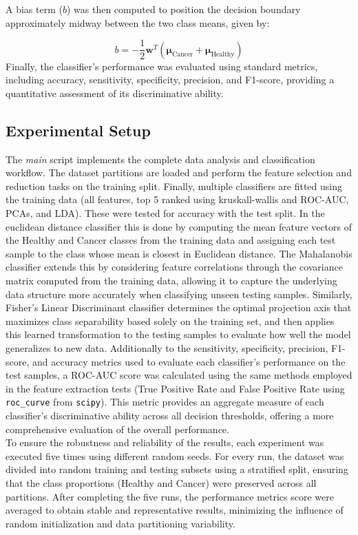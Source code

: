 \documentclass[a4paper,12pt]{article}
\begin{document}
A bias term ($b$) was then computed to position the decision boundary approximately midway between the two class means, given by:

\[
b = -\frac{1}{2}\mathbf{w}^T(\boldsymbol{\mu}_{\text{Cancer}} + \boldsymbol{\mu}_{\text{Healthy}})
\]
Finally, the classifier’s performance was evaluated using standard metrics, including 
accuracy, sensitivity, specificity, precision, and F1-score, providing a quantitative assessment of its discriminative ability.



\subsection{Experimental Setup}

The \textit{main} script implements the complete data analysis and classification workflow. The dataset partitions are loaded and perform the feature selection and reduction tasks on the training split. Finally, multiple classifiers are fitted using the training data (all features, top 5 ranked using kruskall-wallis and ROC-AUC, PCAs, and LDA). These were tested for accuracy with the test split. In the euclidean distance classifier this is done by computing the mean feature vectors of the Healthy and Cancer classes from the training data and assigning each test sample to the class whose mean is closest in Euclidean distance. The Mahalanobis classifier extends this by considering feature correlations through the covariance matrix computed from the training data, allowing it to capture the underlying data structure more accurately when classifying unseen testing samples. Similarly, Fisher’s Linear Discriminant classifier determines the optimal projection axis that maximizes class separability based solely on the training set, and then applies this learned transformation to the testing samples to evaluate how well the model generalizes to new data. Additionally to the sensitivity, specificity, precision, F1-score, and accuracy metrics used to evaluate each classifier's performance on the test samples, a ROC-AUC score was calculated using the same methods employed in the feature extraction tests (True Positive Rate and False Positive Rate using \texttt{roc\_curve} from \texttt{scipy}).  
This metric provides an aggregate measure of each classifier’s discriminative ability across all decision thresholds, offering a more comprehensive evaluation of the overall performance.\\

\noindent
To ensure the robustness and reliability of the results, each experiment was executed five times using different random seeds.
For every run, the dataset was divided into random training and testing subsets using a stratified split, ensuring that the class proportions (Healthy and Cancer) were preserved across all partitions.
After completing the five runs, the performance metrics score were averaged to obtain stable and representative results, minimizing the influence of random initialization and data partitioning variability.
\end{document}
